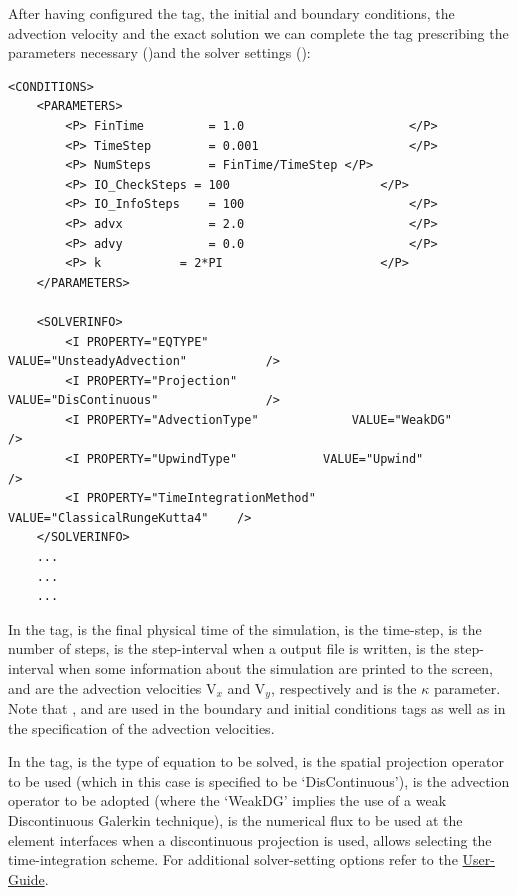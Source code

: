 After having configured the  tag, the initial and boundary conditions, 
the advection velocity and the exact solution we can complete the tag  
prescribing the parameters necessary ()and the solver settings ():
%
\begin{lstlisting}[style=XMLStyle]
<CONDITIONS>
    <PARAMETERS>
        <P> FinTime  		= 1.0               		</P>
        <P> TimeStep 		= 0.001             		</P>
        <P> NumSteps 		= FinTime/TimeStep </P>
        <P> IO_CheckSteps = 100               		</P>
        <P> IO_InfoSteps 	= 100               		</P>
        <P> advx 			= 2.0               		</P>
        <P> advy 			= 0.0               		</P>
        <P> k 			= 2*PI              		</P>
    </PARAMETERS>
        
    <SOLVERINFO>
        <I PROPERTY="EQTYPE"                		VALUE="UnsteadyAdvection"   		/>
        <I PROPERTY="Projection"            		VALUE="DisContinuous"       		/>
        <I PROPERTY="AdvectionType"      		VALUE="WeakDG"              		/>
        <I PROPERTY="UpwindType"           	VALUE="Upwind"              		/>
        <I PROPERTY="TimeIntegrationMethod" 	VALUE="ClassicalRungeKutta4"	/>
    </SOLVERINFO>
    ...
    ...
    ...
\end{lstlisting}
%
In the  tag,  is the final physical time of the simulation, 
 is the time-step,  is the number of steps,  
is the step-interval when a output file is written,  is the step-interval when 
some information about the simulation are printed to the screen,  and  
are the advection velocities V$_{x}$ and V$_{y}$, respectively and  is the $\kappa$ 
parameter. Note that ,  and  are used in the boundary and initial 
conditions tags as well as in the specification of the advection velocities.

In the  tag,  is the type of equation to be solved,  
is the spatial projection operator to be used (which in this case is specified to be `DisContinuous'), 
 is the advection operator to be adopted (where the  `WeakDG' 
implies the use of a weak Discontinuous Galerkin technique),  is the numerical 
flux to be used at the element interfaces when a discontinuous projection is used,  
allows selecting the time-integration scheme. For additional solver-setting options refer to the 
\href{http://www.nektar.info/downloads/8}{User-Guide}.


